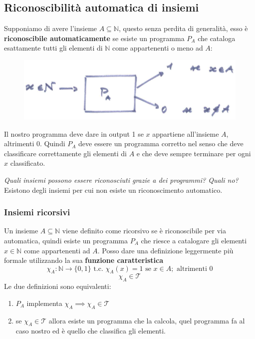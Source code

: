 \documentclass{article}
\begin{document}
\subsection{Riconoscibilità automatica di insiemi}
Supponiamo di avere l'insieme $A\subseteq\mathbb{N}$, questo senza perdita di generalità,
esso è \textbf{riconoscibile automaticamente} se esiste un programma $P_A$ che cataloga
esattamente tutti gli elementi di $\mathbb{N}$ come appartenenti o meno ad $A$:
\begin{figure}[H]
    \centering
    \includegraphics[scale=0.5]{images/insiemi_riconoscibili.png}
\end{figure}
Il nostro programma deve dare in output 1 se $x$ appartiene all'insieme $A$, altrimenti 0. Quindi
$P_A$ deve essere un programma corretto nel senso che deve classificare correttamente
gli elementi di $A$ e che deve sempre terminare per ogni $x$ classificato.

\textit{Quali insiemi possono essere riconosciuti grazie a dei programmi? Quali no?} Esistono
degli insiemi per cui non esiste un riconoscimento automatico.

\subsubsection{Insiemi ricorsivi}
Un insieme $A\subseteq\mathbb{N}$ viene definito come ricorsivo se è riconoscibile per via automatica, quindi
esiste un programma $P_A$ che riesce a catalogare gli elementi $x\in\mathbb{N}$
come appartenenti ad $A$. Posso dare una definizione leggermente più formale utilizzando
la sua \textbf{funzione caratteristica}
$$\chi_A:\mathbb{N}\rightarrow\{0,1\}\text{ t.c. }\chi_A(x)=1\text{ se }x\in A;\text{ altrimenti }0$$
$$\chi_A\in\mathcal{T}$$
Le due definizioni sono equivalenti:
\begin{enumerate}
    \item $P_A$ implementa $\chi_A\implies \chi_A\in\mathcal{T}$
    \item se $\chi_A\in\mathcal{T}$ allora esiste un programma che la calcola,
          quel programma fa al caso nostro ed è quello che classifica gli elementi.
\end{enumerate}
\end{document}
